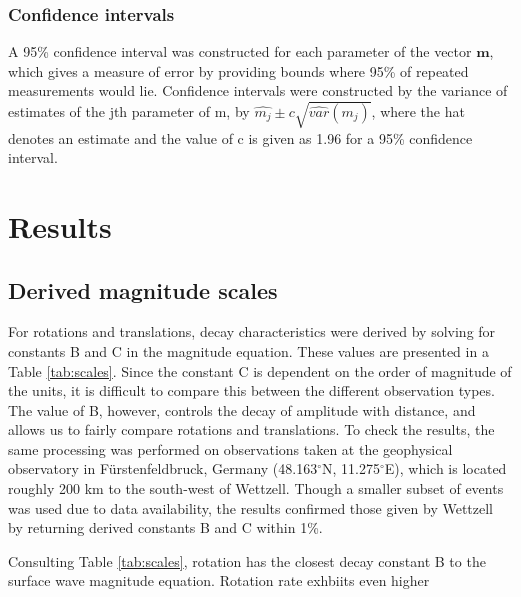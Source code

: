 \documentclass{gji}
\begin{document}
\subsubsection{Confidence intervals}
A 95\% confidence interval was constructed for each parameter of the vector $\mathbf{m}$, which gives a measure of error by providing bounds where 95\% of repeated measurements would lie. Confidence intervals were constructed by the variance of estimates of the jth parameter of m, by $\hat{m_j} \pm c \sqrt{\hat{var}(\hat{m_j})}$, where the hat denotes an estimate and the value of c is given as 1.96 for a 95\% confidence interval.

\section{Results}
\subsection{Derived magnitude scales}
For rotations and translations, decay characteristics were derived by solving for constants B and C in the magnitude equation. These values are presented in a Table \ref{tab:scales}. Since the constant C is dependent on the order of magnitude of the units, it is difficult to compare this between the different observation types. The value of B, however, controls the decay of amplitude with distance, and allows us to fairly compare rotations and translations. To check the results, the same processing was performed on observations taken at the geophysical observatory in F\"urstenfeldbruck, Germany (48.163$^\circ$N, 11.275$^\circ$E), which is located roughly 200 km to the south-west of Wettzell. Though a smaller subset of events was used due to data availability, the results confirmed those given by Wettzell by returning derived constants B and C within 1\%.

Consulting Table \ref{tab:scales}, rotation has the closest decay constant B to the surface wave magnitude equation. Rotation rate exhbiits even higher 
\end{document}
